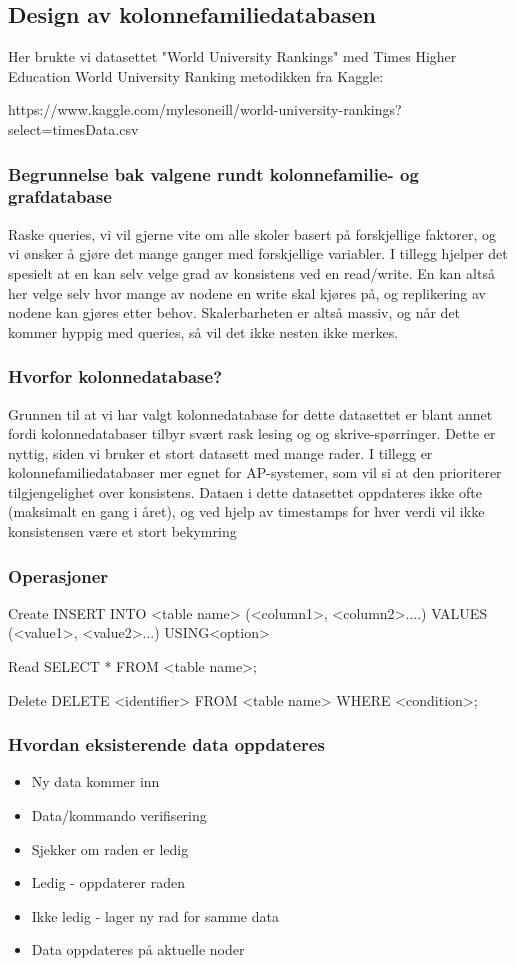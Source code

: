 \subsection{Design av kolonnefamiliedatabasen}
Her brukte vi datasettet "World University Rankings" med Times Higher Education World University Ranking metodikken fra Kaggle:

https://www.kaggle.com/mylesoneill/world-university-rankings?select=timesData.csv

\subsubsection{Begrunnelse bak valgene rundt kolonnefamilie- og grafdatabase}
Raske queries, vi vil gjerne vite om alle skoler basert på forskjellige faktorer, og vi ønsker å gjøre det 
mange ganger med forskjellige variabler. I tillegg hjelper det spesielt at en kan selv velge grad av 
konsistens ved en read/write. En kan altså her velge selv hvor mange av nodene en write skal kjøres 
på, og replikering av nodene kan gjøres etter behov. Skalerbarheten er altså massiv, og når det 
kommer hyppig med queries, så vil det ikke nesten ikke merkes.

\subsubsection{Hvorfor kolonnedatabase?}
Grunnen til at vi har valgt kolonnedatabase for dette datasettet er blant annet fordi 
kolonnedatabaser tilbyr svært rask lesing og og skrive-spørringer. Dette er nyttig, siden vi bruker et 
stort datasett med mange rader. I tillegg er kolonnefamiliedatabaser mer egnet for AP-systemer, 
som vil si at den prioriterer tilgjengelighet over konsistens. Dataen i dette datasettet oppdateres ikke 
ofte (maksimalt en gang i året), og ved hjelp av timestamps for hver verdi vil ikke konsistensen være 
et stort bekymring

\subsubsection{Operasjoner}
Create
INSERT INTO <table name>
(<column1>, <column2>....)
VALUES (<value1>, <value2>...)
USING<option>

Read
SELECT * FROM <table name>;

Delete
DELETE <identifier> FROM <table name> WHERE <condition>;

\subsubsection{Hvordan eksisterende data oppdateres}
\begin{itemize}
  \item Ny data kommer inn
  \item Data/kommando verifisering
  \item Sjekker om raden er ledig
  \item Ledig - oppdaterer raden
  \item Ikke ledig - lager ny rad for samme data
  \item Data oppdateres på aktuelle noder
\end{itemize}

